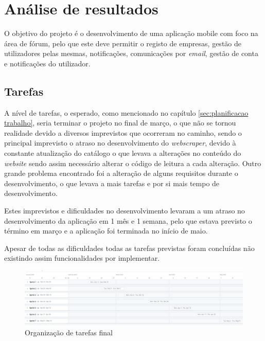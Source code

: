 \chapter{Análise de resultados}
 O objetivo do projeto é o desenvolvimento de uma aplicação mobile com foco na área de fórum, pelo que este deve permitir o registo de empresas, gestão de utilizadores pelas mesmas, notificações, comunicações por \textit{email}, gestão de conta e notificações do utilizador.



 \section{Tarefas}

A nível de tarefas, o esperado, como mencionado no capítulo \ref{sec:planificacao trabalho}, seria terminar o projeto no final de março, o que não se tornou realidade devido a diversos imprevistos que ocorreram no caminho, sendo o principal imprevisto o atraso no desenvolvimento do \textit{webscraper}, devido à constante atualização do catálogo o que levava a alterações no conteúdo do \textit{website} sendo assim necessário alterar o código de leitura a cada alteração. Outro grande problema encontrado foi a alteração de alguns requisitos durante o desenvolvimento, o que levava a mais tarefas e por si mais tempo de desenvolvimento.

Estes imprevistos e dificuldades no desenvolvimento levaram a um atraso no desenvolvimento da aplicação em 1 mês e 1 semana, pelo que estava previsto o término em março e a aplicação foi terminada no início de maio.

Apesar de todas as dificuldades todas as tarefas previstas foram concluídas não existindo assim funcionalidades por implementar.

\begin{figure}[htb]
  \centering
  \includegraphics[width=\textwidth]{images/analise_resultados/planeamento_final.png}
  \caption{Organização de tarefas final}
  \label{fig:78}
\end{figure}

\newpage


